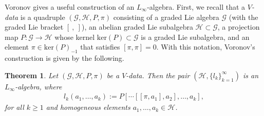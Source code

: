 \documentclass[a4paper,reqno,10pt]{amsart}
\theoremstyle{plain}
\newtheorem{thm}{Theorem}[section]
\theoremstyle{definition}
\theoremstyle{remark}
\begin{document}
Voronov \cite{voro} gives a useful construction of an $L_\infty$-algebra. First, we recall that a {\em $V$-data} is a quadruple $(\mathcal{G}, \mathcal{H}, P, \pi)$ consisting of a graded Lie algebra $\mathcal{G}$ (with the graded Lie bracket $[~, ~]$), an abelian graded Lie subalgebra $\mathcal{H} \subset \mathcal{G}$, a projection map $P : \mathcal{G} \rightarrow \mathcal{H}$ whose kernel $\mathrm{ker} (P) \subset \mathcal{G}$ is a graded Lie subalgebra, and an element $\pi \in \mathrm{ker} (P)_{- 1}$ that satisfies $[\pi, \pi] = 0$. With this notation, Voronov's construction is given by the following.

\begin{thm}\label{thm-voro}
    Let $(\mathcal{G}, \mathcal{H}, P, \pi)$ be a $V$-data. Then the pair $(\mathcal{H}, \{ l_k \}_{k=1}^\infty)$ is an $L_\infty$-algebra, where 
    \begin{align*}
        l_k (a_1, \ldots, a_k) := P [ \cdots [[ \pi, a_1], a_2], \ldots, a_k],
    \end{align*}
    for all $k \geq 1$ and homogeneous elements $a_1, \ldots, a_k \in \mathcal{H}$.
\end{thm}
\end{document}
